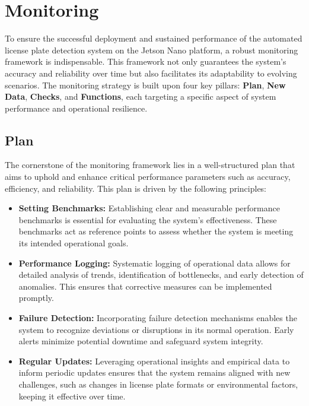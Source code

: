 %
%

\chapter{Monitoring}

To ensure the successful deployment and sustained performance of the automated license plate detection system on the Jetson Nano platform, a robust monitoring framework is indispensable. This framework not only guarantees the system's accuracy and reliability over time but also facilitates its adaptability to evolving scenarios. The monitoring strategy is built upon four key pillars: \textbf{Plan}, \textbf{New Data}, \textbf{Checks}, and \textbf{Functions}, each targeting a specific aspect of system performance and operational resilience.

\section{Plan}

The cornerstone of the monitoring framework lies in a well-structured plan that aims to uphold and enhance critical performance parameters such as accuracy, efficiency, and reliability. This plan is driven by the following principles:
\begin{itemize}
	\item \textbf{Setting Benchmarks:} Establishing clear and measurable performance benchmarks is essential for evaluating the system's effectiveness. These benchmarks act as reference points to assess whether the system is meeting its intended operational goals.
	\item \textbf{Performance Logging:} Systematic logging of operational data allows for detailed analysis of trends, identification of bottlenecks, and early detection of anomalies. This ensures that corrective measures can be implemented promptly.
	\item \textbf{Failure Detection:} Incorporating failure detection mechanisms enables the system to recognize deviations or disruptions in its normal operation. Early alerts minimize potential downtime and safeguard system integrity.
	\item \textbf{Regular Updates:} Leveraging operational insights and empirical data to inform periodic updates ensures that the system remains aligned with new challenges, such as changes in license plate formats or environmental factors, keeping it effective over time.
\end{itemize}

